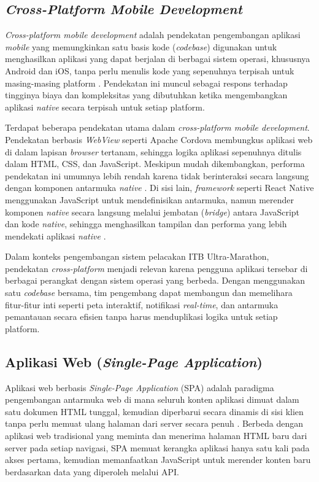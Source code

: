 \subsection{\textit{Cross-Platform Mobile Development}}
\textit{Cross-platform mobile development} adalah pendekatan pengembangan aplikasi \textit{mobile} yang memungkinkan satu basis kode (\textit{codebase}) digunakan untuk menghasilkan aplikasi yang dapat berjalan di berbagai sistem operasi, khususnya Android dan iOS, tanpa perlu menulis kode yang sepenuhnya terpisah untuk masing-masing platform \cite{nawrocki2021comparison}. Pendekatan ini muncul sebagai respons terhadap tingginya biaya dan kompleksitas yang dibutuhkan ketika mengembangkan aplikasi \textit{native} secara terpisah untuk setiap platform.

Terdapat beberapa pendekatan utama dalam \textit{cross-platform mobile development}. Pendekatan berbasis \textit{WebView} seperti Apache Cordova membungkus aplikasi web di dalam lapisan \textit{browser} tertanam, sehingga logika aplikasi sepenuhnya ditulis dalam HTML, CSS, dan JavaScript. Meskipun mudah dikembangkan, performa pendekatan ini umumnya lebih rendah karena tidak berinteraksi secara langsung dengan komponen antarmuka \textit{native} \cite{heitkotter2012evaluating}. Di sisi lain, \textit{framework} seperti React Native menggunakan JavaScript untuk mendefinisikan antarmuka, namun merender komponen \textit{native} secara langsung melalui jembatan (\textit{bridge}) antara JavaScript dan kode \textit{native}, sehingga menghasilkan tampilan dan performa yang lebih mendekati aplikasi \textit{native} \cite{majchrzak2017comprehensive}.

Dalam konteks pengembangan sistem pelacakan ITB Ultra-Marathon, pendekatan \textit{cross-platform} menjadi relevan karena pengguna aplikasi tersebar di berbagai perangkat dengan sistem operasi yang berbeda. Dengan menggunakan satu \textit{codebase} bersama, tim pengembang dapat membangun dan memelihara fitur-fitur inti seperti peta interaktif, notifikasi \textit{real-time}, dan antarmuka pemantauan secara efisien tanpa harus menduplikasi logika untuk setiap platform.

\subsection{Aplikasi Web (\textit{Single-Page Application})}
\label{subsec:spa}

Aplikasi web berbasis \textit{Single-Page Application} (SPA) adalah paradigma pengembangan antarmuka web di mana seluruh konten aplikasi dimuat dalam satu dokumen HTML tunggal, kemudian diperbarui secara dinamis di sisi klien tanpa perlu memuat ulang halaman dari server secara penuh \cite{mikowski2013single}. Berbeda dengan aplikasi web tradisional yang meminta dan menerima halaman HTML baru dari server pada setiap navigasi, SPA memuat kerangka aplikasi hanya satu kali pada akses pertama, kemudian memanfaatkan JavaScript untuk merender konten baru berdasarkan data yang diperoleh melalui API.

